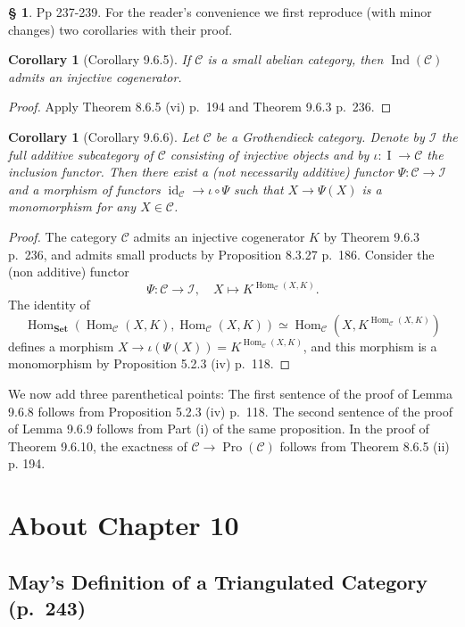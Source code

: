 \documentclass[12pt]{article}%
\newtheorem{cor}[thm]{Corollary}
\theoremstyle{remark}
\theoremstyle{definition}
\newtheorem{s}[thm]{\S}%
\newcommand{\cc}{\mathcal}
\newcommand{\oo}{\operatorname}
\newcommand{\C}{\mathcal C}
\newcommand{\Set}{\mathbf{Set}}
\DeclareMathOperator{\id}{id}
\DeclareMathOperator{\Hom}{Hom}%
\DeclareMathOperator{\Ind}{Ind}
\begin{document}
\begin{s}
Pp 237-239. For the reader's convenience we first reproduce (with minor changes) two corollaries with their proof. 
%
\begin{cor}[Corollary 9.6.5]
If $\C$ is a small abelian category, then $\Ind(\C)$ admits an injective cogenerator.
\end{cor}
%
\begin{proof}
Apply Theorem 8.6.5 (vi) p.~194 and Theorem 9.6.3 p.~236.
\end{proof}
%
\begin{cor}[Corollary 9.6.6]
Let $\C$ be a Grothendieck category. Denote by $\cc I$ the full additive subcategory of $\C$ consisting of injective objects and by $\iota:\oo I\to\C$ the inclusion functor. Then there exist a (not necessarily additive) functor $\Psi:\C\to\cc I$ and a morphism of functors $\id_\C\to\iota\circ\Psi$ such that $X\to\Psi(X)$ is a monomorphism for any $X\in\C$.
\end{cor}
%
\begin{proof}
The category $\C$ admits an injective cogenerator $K$ by Theorem 9.6.3 p.~236, and admits small products by Proposition 8.3.27 p.~186. Consider the (non additive) functor 
$$
\Psi:\C\to\cc I,\quad X\mapsto K^{\Hom_\C(X,K)}.
$$ 
The identity of 
$$
\Hom_{\Set}(\Hom_\C(X,K),\Hom_\C(X,K))\simeq\Hom_\C(X,K^{\Hom_\C(X,K)})
$$ 
defines a morphism $X\to\iota(\Psi(X))=K^{\Hom_\C(X,K)}$, and this morphism is a monomorphism by Proposition 5.2.3 (iv) p.~118.
\end{proof}

We now add three parenthetical points: The first sentence of the proof of Lemma 9.6.8 follows from Proposition 5.2.3 (iv) p.~118. The second sentence of the proof of Lemma 9.6.9 follows from Part (i) of the same proposition. In the proof of Theorem 9.6.10, the exactness of $\C\to\oo{Pro}(\C)$ follows from Theorem 8.6.5 (ii) p. 194.
\end{s}


\section{About Chapter 10}

\subsection{May's Definition of a Triangulated Category (p.~243)}
\end{document}
